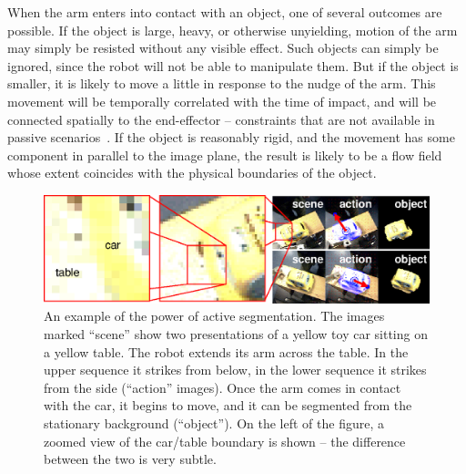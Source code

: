 When the arm enters into contact with an object, one of several
outcomes are possible.  If the object is large, heavy, or otherwise
unyielding, motion of the arm may simply be resisted without any
visible effect.  Such objects can simply be ignored, since the robot
will not be able to manipulate them.  But if the object is smaller, it
is likely to move a little in response to the nudge of the arm.  This
movement will be temporally correlated with the time of impact, and
will be connected spatially to the end-effector -- constraints that
are not available in passive scenarios~\cite{birchfield99depth}.  If
the object is reasonably rigid, and the movement has some component in
parallel to the image plane, the result is likely to be a flow field
whose extent coincides with the physical boundaries of the object.



\begin{figure}[tbh]
  \centerline{\includegraphics[width=\textwidth]{fig-double-yellow}}
  \caption{
%
An example of the power of active segmentation.  The images
marked ``scene'' show two presentations of a yellow toy car
sitting on a yellow table.  The robot extends its arm across
the table.  In the upper sequence it strikes from below, in the
lower sequence it strikes from the side (``action'' images).
Once the arm comes in contact with the car, it begins to move,
and it can be segmented from the stationary background (``object'').
On the left of the figure, a zoomed view of the car/table
boundary is shown -- the difference between the two is very subtle.
%
} 
  \label{fig:poking-zoom}
\end{figure}


